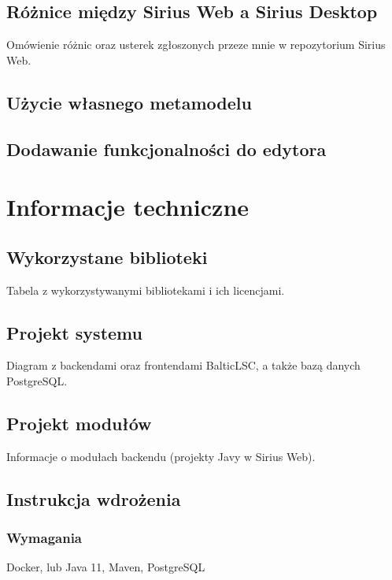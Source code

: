 \section{Różnice między Sirius Web a Sirius Desktop}

Omówienie różnic oraz usterek zgłoszonych przeze mnie w repozytorium Sirius
Web.

\section{Użycie własnego metamodelu}

\section{Dodawanie funkcjonalności do edytora}

\chapter{Informacje techniczne}

\section{Wykorzystane biblioteki}

Tabela z wykorzystywanymi bibliotekami i ich licencjami.

\section{Projekt systemu}

Diagram z backendami oraz frontendami BalticLSC, a także bazą danych
PostgreSQL\@.

\section{Projekt modułów}

Informacje o modułach backendu (projekty Javy w Sirius Web).

\section{Instrukcja wdrożenia}

\subsection{Wymagania}

Docker, lub Java 11, Maven, PostgreSQL

